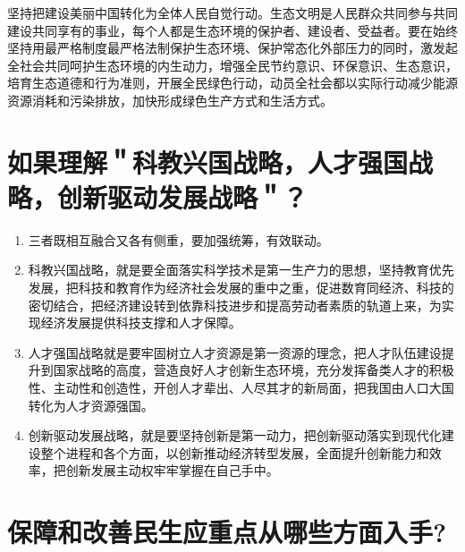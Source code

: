 \documentclass[12pt, a4paper, oneside]{ctexbook}
\begin{document}
坚持把建设美丽中国转化为全体人民自觉行动。生态文明是人民群众共同参与共同建设共同享有的事业，每个人都是生态环境的保护者、建设者、受益者。要在始终坚持用最严格制度最严格法制保护生态环境、保护常态化外部压力的同时，激发起全社会共同呵护生态环境的内生动力，增强全民节约意识、环保意识、生态意识，培育生态道德和行为准则，开展全民绿色行动，动员全社会都以实际行动减少能源资源消耗和污染排放，加快形成绿色生产方式和生活方式。


\section{如果理解＂科教兴国战略，人才强国战略，创新驱动发展战略＂？}

\begin{enumerate}
\item 三者既相互融合又各有侧重，要加强统筹，有效联动。

\item 科教兴国战略，就是要全面落实科学技术是第一生产力的思想，坚持教育优先发展，把科技和教育作为经济社会发展的重中之重，促进数育同经济、科技的密切结合，把经济建设转到依靠科技进步和提高劳动者素质的轨道上来，为实现经济发展提供科技支撑和人才保障。

\item 人才强国战略就是要牢固树立人才资源是第一资源的理念，把人才队伍建设提升到国家战略的高度，营造良好人才创新生态环境，充分发挥备类人才的积极性、主动性和创造性，开创人才辈出、人尽其才的新局面，把我国由人口大国转化为人才资源强国。

\item 创新驱动发展战略，就是要坚持创新是第一动力，把创新驱动落实到现代化建设整个进程和各个方面，以创新推动经济转型发展，全面提升创新能力和效率，把创新发展主动权牢牢掌握在自己手中。
\end{enumerate}


\section{保障和改善民生应重点从哪些方面入手?}
\end{document}
